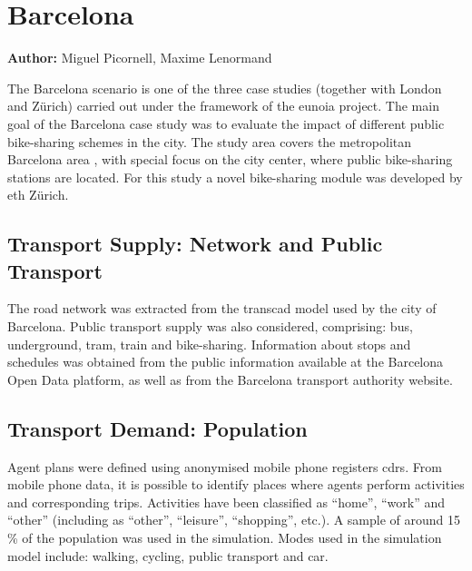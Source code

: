 \chapter{Barcelona}
\label{ch:barcelona}
\hfill \textbf{Author:} Miguel Picornell, Maxime Lenormand


The Barcelona scenario is one of the three case studies (together with London and Zürich) carried out under the framework of the \gls{eunoia} project. The main goal of the Barcelona case study was to evaluate the impact of different public bike-sharing schemes in the city. The study area covers the metropolitan Barcelona area , with special focus on the city center, where public bike-sharing stations are located. For this study a novel bike-sharing module was developed by \gls{eth} Zürich.

\section{Transport Supply: Network and Public Transport}
The road network was extracted from the \gls{transcad} model used by the city of Barcelona. Public transport supply was also considered, comprising: bus, underground, tram, train and bike-sharing. Information about stops and schedules was obtained from the public information available at the Barcelona Open Data platform, as well as from the Barcelona transport authority website. 

\section{Transport Demand: Population} 
Agent plans were defined using anonymised mobile phone registers \glspl{cdr}. From mobile phone data, it is possible to identify places where agents perform activities and corresponding trips. Activities have been classified as ``home'', ``work'' and ``other'' (including as ``other'', ``leisure'', ``shopping'', etc.). A sample of around 15\,\% of the population was used in the simulation. Modes used  in the simulation model include: walking, cycling, public transport and car.

